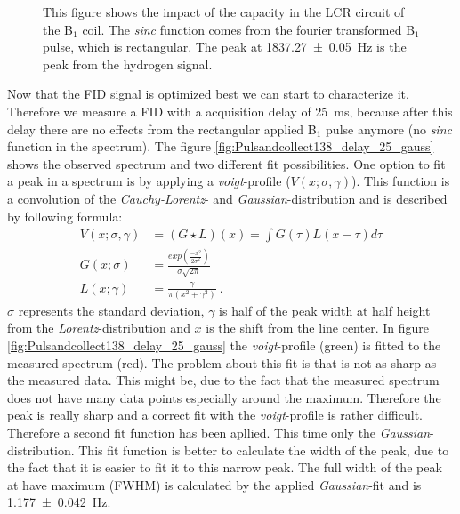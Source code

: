 \begin{figure}[H]
    \centering
    
    \caption[This figure shows the impact of the capacity in the LCR circuit of the B$_1$ coil.]{This figure shows the impact of the capacity in the LCR circuit of the B$_1$ coil. The \textit{sinc} function comes from the fourier transformed B$_1$ pulse, which is rectangular. The peak at \SI{1837.27 \pm 0.05}{\hertz} is the peak from the hydrogen signal.}
    \label{fig:Pulsandcollect}
\end{figure}
Now that the FID signal is optimized best we can start to characterize it. Therefore we measure a FID with a acquisition delay of \SI{25}{\milli \second}, because after this delay there are no effects from the rectangular applied B$_1$ pulse anymore (no \textit{sinc} function in the spectrum). The figure \ref{fig:Pulsandcollect138_delay_25_gauss} shows the observed spectrum and two different fit possibilities.\newline
One option to fit a peak in a spectrum is by applying a \textit{voigt}-profile ($V(x;\sigma , \gamma)$). This function is a convolution of the \textit{Cauchy-Lorentz}- and \textit{Gaussian}-distribution and is described by following formula:
\begin{align}
    V(x;\sigma , \gamma) &= ( G \star L)(x) = \int G(\tau) L(x-\tau) d\tau \\
    G(x;\sigma) &= \frac{exp\left(\frac{-x^2}{2\sigma^2}\right)}{\sigma \sqrt{2 \pi}} \\
    L(x;\gamma)  &= \frac{\gamma}{\pi \left( x^2+\gamma^2\right)} \ .
    \label{eq: voigt} 
\end{align}
$\sigma$ represents the standard deviation, $\gamma$ is half of the peak width at half height from the \textit{Lorentz}-distribution and $x$ is the shift from the line center. In figure \ref{fig:Pulsandcollect138_delay_25_gauss} the \textit{voigt}-profile (green) is fitted to the measured spectrum (red). The problem about this fit is that is not as sharp as the measured data. This might be, due to the fact that the measured spectrum does not have many data points especially around the maximum. Therefore the peak is really sharp and a correct fit with the \textit{voigt}-profile is rather difficult. Therefore a second fit function has been apllied. This time only the \textit{Gaussian}-distribution. This fit function is better to calculate the width of the peak, due to the fact that it is easier to fit it to this narrow peak. The full width of the peak at have maximum (FWHM) is calculated by the applied \textit{Gaussian}-fit and is \SI{1.177 \pm 0.042}{\hertz}. \newline
